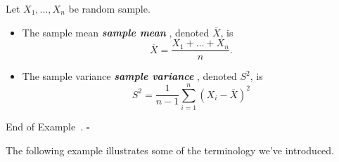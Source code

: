 \documentclass[10pt]{article}
\theoremstyle{definition}
\newtheorem{example}[theorem]{Example}
\renewenvironment{example}
{\begin{oldexample}}
  {\par\smallskip\hfill   End of Example~\theexample. $\square$    \par\end{oldexample}}
\newcommand{\1}[1]{\textbf{1}_{\left[#1\right]}} %
\DeclareRobustCommand{\demph}[1]{%
  \ifmmode
  {\color{Blue}#1}%
  \else
  {\color{Blue}\bfseries\slshape #1}%
  \fi
}
\begin{document}
\begin{example}
  Let $X_{1},\ldots,X_{n}$ be random sample.
  \begin{itemize}
    \item The \demph{sample mean}, denoted $\overline{X}$, is
    \begin{equation*}
      \overline{X}=\frac{X_{1}+\ldots+X_{n}}{n}.
    \end{equation*}
    \item The \demph{sample variance}, denoted $S^{2}$, is
    \begin{equation*}
      S^{2} = \frac{1}{n-1}\sum_{i=1}^{n}(X_{i} - \overline{X})^{2}
    \end{equation*}
  \end{itemize}
\end{example}



The following example illustrates some of the terminology we've introduced.
\end{document}
